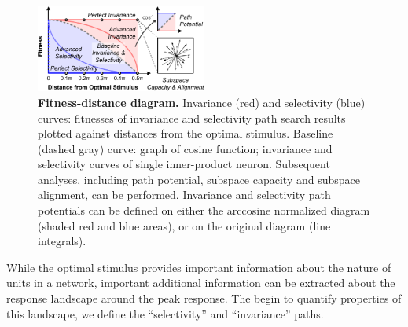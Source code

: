 \begin{figure}
\centering \includegraphics[width=0.5\textwidth]{Figs/fda.pdf} 
\caption{
{\bf Fitness-distance diagram.} Invariance (red) and selectivity (blue) curves: fitnesses of invariance and selectivity path search results plotted against distances from the optimal stimulus. Baseline (dashed gray) curve: graph of cosine function; invariance and selectivity curves of single inner-product neuron. Subsequent analyses, including path potential, subspace capacity and subspace alignment, can be performed. Invariance and selectivity path potentials can be defined on either the arccosine normalized diagram (shaded red and blue areas), or on the original diagram (line integrals).}
\label{fig:fd_diag}
\end{figure}


While the optimal stimulus provides important information about the nature of units in a network, important additional information can be extracted about the response landscape around the peak response.  The begin to quantify properties of this landscape, we define the ``selectivity'' and ``invariance'' paths.

